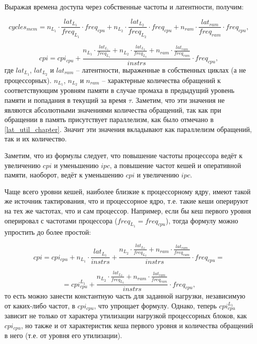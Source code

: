     Выражая времена доступа через собственные частоты и латентности, получим:

    \begin{equation}
        cycles_{mem} = n_{L_1} \cdot \frac{lat_{L_1}}{freq_{L_1}} \cdot freq_{cpu} +
        n_{L_2} \cdot \frac{lat_{L_2}}{freq_{L_2}} \cdot freq_{cpu} +
        n_{ram} \cdot \frac{lat_{ram}}{freq_{ram}} \cdot freq_{cpu},
    \end{equation}

    \begin{equation}
        cpi = cpi_{cpu} + \frac{n_{L_1} \cdot \frac{lat_{L_1}}{freq_{L_1}} +
        n_{L_2} \cdot \frac{lat_{L_2}}{freq_{L_2}} +
        n_{ram} \cdot \frac{lat_{ram}}{freq_{ram}}}{instrs} \cdot freq_{cpu},
    \end{equation}
    где $lat_{L_1}$, $lat_{L_2}$ и $lat_{ram}$ -- латентности, выраженные в собственных циклах
    (а не процессорных). $n_{L_1}$, $n_{L_2}$ и $n_{ram}$ -- характерные количества обращений к
    соответствующим уровням памяти в случае промаха в предыдущий уровень памяти и попадания
    в текущий за время $\tau$. Заметим, что эти значения не являются абсолютными значениями
    количества обращений, так как при обращении в память присутствует параллелизм, как было отмечано
    в \ref{lat_util_chapter}. Значит эти значения вкладывают как параллелизм обращений, так и их
    количество.

    Заметим, что из формулы следует, что повышение частоты процессора ведёт к увеличению $cpi$
    и уменьшению $ipc$, а повышение частот кешей и оперативной памяти, наоборот, ведёт к
    уменьшению $cpi$ и увеличению $ipc$.

    Чаще всего уровни кешей, наиболее близкие к процессорному ядру, имеют такой же источник
    тактирования, что и процессорное ядро, т.е. такие кеши оперируют на тех же частотах, что и
    сам процессор. Например, если бы кеш первого уровня оперировал с частотами процессора
    ($freq_{L_1} = freq_{cpu}$), тогда формулу можно упростить до более простой:

    \begin{equation}
        cpi = cpi_{cpu} + n_{L_1} \cdot \frac{lat_{L_1}}{instrs} +
        \frac{n_{L_2} \cdot \frac{lat_{L_2}}{freq_{L_2}} +
        n_{ram} \cdot \frac{lat_{ram}}{freq_{ram}}}{instrs} \cdot freq_{cpu} =
    \end{equation}

    \begin{equation}
        = cpi_{cpu}^{L_1} + \frac{n_{L_2} \cdot \frac{lat_{L_2}}{freq_{L_2}} +
        n_{ram} \cdot \frac{lat_{ram}}{freq_{ram}}}{instrs} \cdot freq_{cpu},
    \end{equation}
    то есть можно занести константную часть для заданной нагрузки, независимую от каких-либо
    частот, в $cpi_{cpu}$, что упрощает формулу. Однако, теперь $cpi_{cpu}^{L_1}$ зависит
    не только от характера утилизации нагрузкой процессорных блоков, как $cpi_{cpu}$, но
    также и от характеристик кеша первого уровня и количества обращений в него
    (т.е. от уровня его утилизации).

